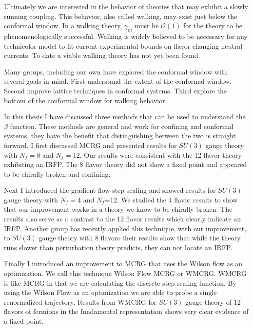 Ultimately we are interested in the behavior of theories that may exhibit a slowly running coupling.
This behavior, also called walking, may exist just below the conformal window.
In a walking theory, $\gamma_m$ must be $\mathcal{O}(1)$ for the theory to be phenomenologically successful.
Walking is widely believed to be necessary for any technicolor model to fit current experimental bounds on flavor changing neutral currents.
To date a viable walking theory has not yet been found.

Many groups, including our own have explored the conformal window with several goals in mind.
First understand the extent of the conformal window.
Second improve lattice techniques in conformal systems.
Third explore the bottom of the conformal window for walking behavior.

In this thesis I have discussed three methods that can be used to understand the $\beta$ function.
These methods are general and work for confining and conformal systems, they have the benefit that distinguishing between the two is straight forward.
I first discussed MCRG and presented results for $SU(3)$ gauge theory with $N_f=8$ and $N_f=12$.
Our results were consistent with the 12 flavor theory exhibiting an IRFP.
The 8 flavor theory did not show a fixed point and appeared to be chirally broken and confining.

Next I introduced the gradient flow step scaling and showed results for $SU(3)$ gauge theory with $N_f=4$ and $N_f$=12.
We studied the 4 flavor results to show that our improvement works in a theory we know to be chirally broken.
The results also serve as a contrast to the 12 flavor results which clearly indicate an IRFP.
Another group has recently applied this technique, with our improvement, to $SU(3)$ gauge theory with 8 flavors \cite{Hasenfratz:2014rna} their results show that while the theory runs slower than perturbation theory predicts, they can not locate an IRFP.

Finally I introduced an improvement to MCRG that uses the Wilson flow as an optimization.
We call this technique Wilson Flow MCRG or WMCRG.
WMCRG is like MCRG in that we are calculating the discrete step scaling function.
By using the Wilson Flow as an optimization we are able to probe a single renormalized trajectory.
Results from WMCRG for $SU(3)$ gauge theory of 12 flavors of fermions in the fundamental representation shows very clear evidence of a fixed point.

